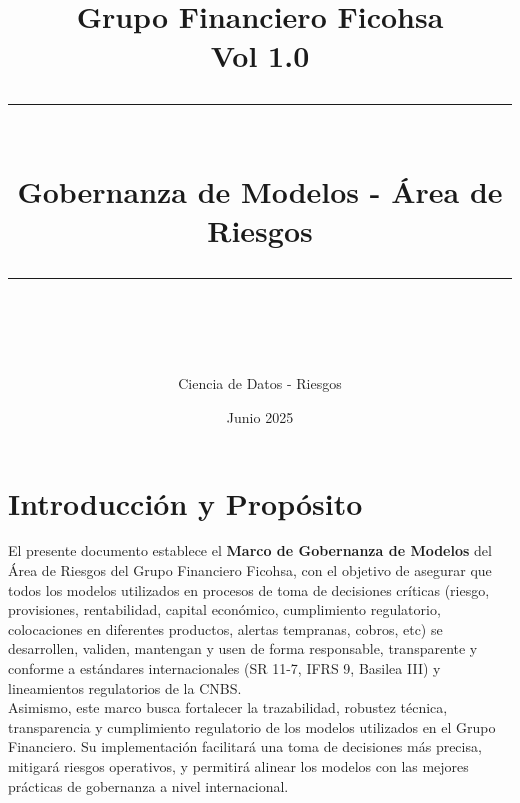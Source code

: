 \documentclass[11pt,oneside]{article}%
\newcommand{\HRule}[1]{\rule{\linewidth}{#1}}
\begin{document}
\title{ \normalsize Grupo Financiero Ficohsa \\
		Vol 1.0
		\\ [2.0cm]
		\HRule{0.5pt} \\
		\LARGE \textbf{Gobernanza de Modelos - Área de Riesgos} %
		\HRule{2pt} \\ [0.1cm]
		\normalsize  \vspace*{5\baselineskip}}

\date{Junio 2025}

\author{Ciencia de Datos - Riesgos}
\maketitle

\newpage
\tableofcontents
\newpage

\section{Introducción y Propósito}

El presente documento establece el \textbf{Marco de Gobernanza de Modelos} del Área de Riesgos del Grupo Financiero Ficohsa, con el objetivo de asegurar que todos los modelos utilizados en procesos de toma de decisiones críticas (riesgo, provisiones, rentabilidad, capital económico, cumplimiento regulatorio, colocaciones en diferentes productos, alertas tempranas, cobros, etc) se desarrollen, validen, mantengan y usen de forma responsable, transparente y conforme a estándares internacionales (SR 11-7, IFRS 9, Basilea III) y lineamientos regulatorios de la CNBS. \\

Asimismo, este marco busca fortalecer la trazabilidad, robustez técnica, transparencia y cumplimiento regulatorio de los modelos utilizados en el Grupo Financiero. Su implementación facilitará una toma de decisiones más precisa, mitigará riesgos operativos, y permitirá alinear los modelos con las mejores prácticas de gobernanza a nivel internacional.

\end{document}
